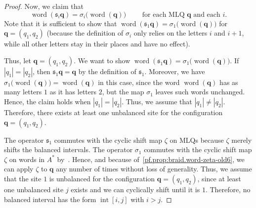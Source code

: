 \documentclass[reqno]{amsart}
\newcommand{\0}{\phantom{c}}
\DeclareMathOperator{\inter}{int} %
\DeclareMathOperator{\word}{word} %
\newcommand{\qq}{\mathbf{q}}
\newcommand{\fraks}{\mathfrak{s}}
\newenvironment{verlong}{}{}
\newcommand{\abs}[1]{\left| #1 \right|}
\theoremstyle{plain}
\theoremstyle{definition}
\numberwithin{equation}{section}
\begin{document}
\begin{verlong}
\begin{proof}
Now, we claim that
\begin{equation}
 \word(\fraks_i \qq) = \sigma_i\bigl( \word(\qq) \bigr)
 \qquad \text{ for each MLQ } \qq \text{ and each } i .
 \label{pf.prop:braid.inter-old6}
\end{equation}
Note that it is sufficient to show that $\word(\fraks_1 \qq) = \sigma_1\bigl( \word(\qq) \bigr)$ for $\qq = (q_1, q_2)$
(because the definition of $\sigma_i$ only relies on the letters $i$ and $i+1$, while all other letters stay in their places and have no effect).

Thus, let $\qq = (q_1, q_2)$.
We want to show $\word(\fraks_1 \qq) = \sigma_1\bigl( \word(\qq) \bigr)$.
If $\abs{q_1} = \abs{q_2}$, then $\fraks_1 \qq = \qq$ by the definition of $\fraks_1$.
Moreover, we have $\sigma_1\bigl( \word(\qq) \bigr) = \word(\qq)$ in this case, since the word $\word(\qq)$ has as many letters $1$ as it has letters $2$, but the map $\sigma_1$ leaves such words unchanged.
Hence, the claim holds when $\abs{q_1} = \abs{q_2}$.
Thus, we assume that $\abs{q_1} \neq \abs{q_2}$.
Therefore, there exists at least one unbalanced site for the configuration $\qq = (q_1, q_2)$.

The operator $\fraks_1$ commutes with the cyclic shift map $\zeta$ on MLQs because $\zeta$ merely shifts the balanced intervals.
The operator $\sigma_1$ commutes with the cyclic shift map $\zeta$ on words in $A^*$ by~\cite[Prop.~5.6.1]{Loth}.
Hence, and because of~\eqref{pf.prop:braid.word-zeta-old6}, we can apply $\zeta$ to $\qq$ any number of times without loss of generality.
Thus, we assume that the site $1$ is unbalanced for the configuration $\qq = (q_1, q_2)$, since at least one unbalanced site $j$ exists and we can cyclically shift until it is $1$.
Therefore, no balanced interval has the form $\inter[i,j]$ with $i > j$.


\end{proof}
\end{verlong}
\end{document}
